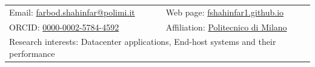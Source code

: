 { %
\noindent
\begin{tabular}{p{8cm}l}
    Email: \href{mailto:farbod.shahinfar@polimi.it}{farbod.shahinfar@polimi.it} & 
      Web page: \href{https://fshahinfar1.github.io}{fshahinfar1.github.io} \\
    ORCID: \href{https://orcid.org/0000-0002-5784-4592}{0000-0002-5784-4592} &
      Affiliation: \href{https://www.deib.polimi.it/eng/people/details/1890688}{Politecnico di Milano}\\
    \multicolumn{2}{l}{Research interests: Datacenter applications, End-host systems and their performance}
\end{tabular}
}

